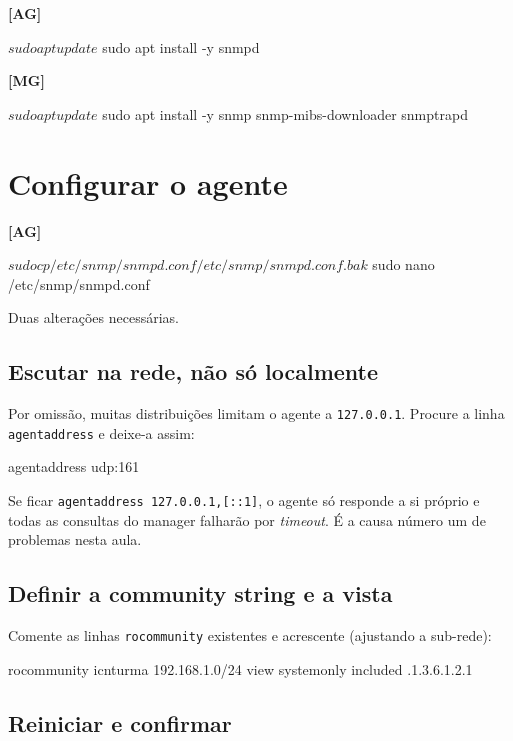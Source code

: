 \documentclass[11pt,a4paper]{article}
\begin{document}
\textbf{[AG]}
\begin{terminal}
$ sudo apt update
$ sudo apt install -y snmpd
\end{terminal}

\textbf{[MG]}
\begin{terminal}
$ sudo apt update
$ sudo apt install -y snmp snmp-mibs-downloader snmptrapd
\end{terminal}

\section{Configurar o agente}

\textbf{[AG]}
\begin{terminal}
$ sudo cp /etc/snmp/snmpd.conf /etc/snmp/snmpd.conf.bak
$ sudo nano /etc/snmp/snmpd.conf
\end{terminal}

Duas alterações necessárias.

\subsection{Escutar na rede, não só localmente}

Por omissão, muitas distribuições limitam o agente a \texttt{127.0.0.1}. Procure a linha \texttt{agentaddress} e deixe-a assim:

\begin{terminal}
agentaddress udp:161
\end{terminal}

\begin{atencao}
Se ficar \texttt{agentaddress 127.0.0.1,[::1]}, o agente só responde a si próprio e todas as consultas do manager falharão por \emph{timeout}. É a causa número um de problemas nesta aula.
\end{atencao}

\subsection{Definir a community string e a vista}

Comente as linhas \texttt{rocommunity} existentes e acrescente (ajustando a sub-rede):

\begin{terminal}
rocommunity icnturma 192.168.1.0/24
view   systemonly  included   .1.3.6.1.2.1
\end{terminal}

\subsection{Reiniciar e confirmar}
\end{document}
